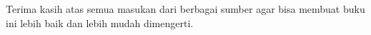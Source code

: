 Terima kasih atas semua masukan dari berbagai sumber agar bisa membuat buku ini 
lebih baik dan lebih mudah dimengerti.